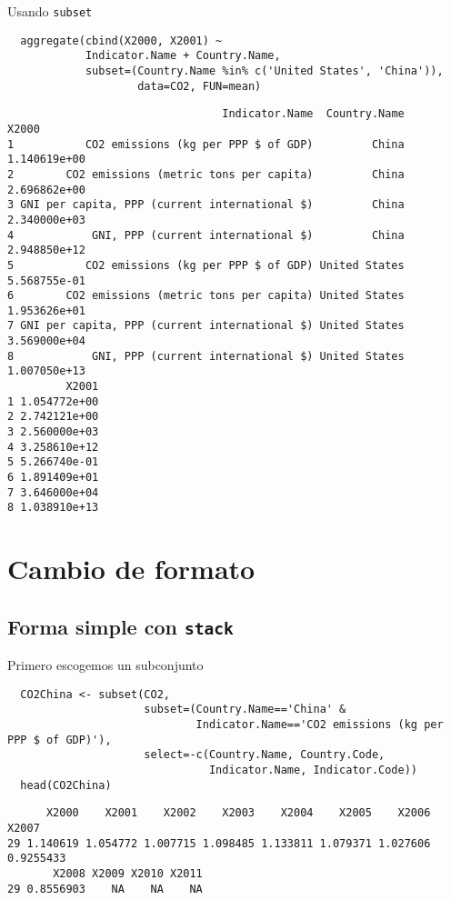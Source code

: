 \documentclass[xcolor={usenames,svgnames,dvipsnames}]{beamer}
\begin{document}
\begin{frame}[fragile,label=sec-2-2-5]{Usando \texttt{subset}}
 \lstset{language=R,label= ,caption= ,numbers=none}
\begin{lstlisting}
  aggregate(cbind(X2000, X2001) ~
            Indicator.Name + Country.Name,
            subset=(Country.Name %in% c('United States', 'China')),
                    data=CO2, FUN=mean)
\end{lstlisting}

\begin{verbatim}
                                 Indicator.Name  Country.Name        X2000
1           CO2 emissions (kg per PPP $ of GDP)         China 1.140619e+00
2        CO2 emissions (metric tons per capita)         China 2.696862e+00
3 GNI per capita, PPP (current international $)         China 2.340000e+03
4            GNI, PPP (current international $)         China 2.948850e+12
5           CO2 emissions (kg per PPP $ of GDP) United States 5.568755e-01
6        CO2 emissions (metric tons per capita) United States 1.953626e+01
7 GNI per capita, PPP (current international $) United States 3.569000e+04
8            GNI, PPP (current international $) United States 1.007050e+13
         X2001
1 1.054772e+00
2 2.742121e+00
3 2.560000e+03
4 3.258610e+12
5 5.266740e-01
6 1.891409e+01
7 3.646000e+04
8 1.038910e+13
\end{verbatim}
\end{frame}

\section{Cambio de formato}
\label{sec-3}
\subsection{Forma simple con \texttt{stack}}
\label{sec-3-1}
\begin{frame}[fragile,label=sec-3-1-1]{Primero escogemos un subconjunto}
 \lstset{language=R,label= ,caption= ,numbers=none}
\begin{lstlisting}
  CO2China <- subset(CO2,
                     subset=(Country.Name=='China' &
                             Indicator.Name=='CO2 emissions (kg per PPP $ of GDP)'),
                     select=-c(Country.Name, Country.Code,
                               Indicator.Name, Indicator.Code))
  head(CO2China)
\end{lstlisting}

\begin{verbatim}
      X2000    X2001    X2002    X2003    X2004    X2005    X2006     X2007
29 1.140619 1.054772 1.007715 1.098485 1.133811 1.079371 1.027606 0.9255433
       X2008 X2009 X2010 X2011
29 0.8556903    NA    NA    NA
\end{verbatim}
\end{frame}
\end{document}
